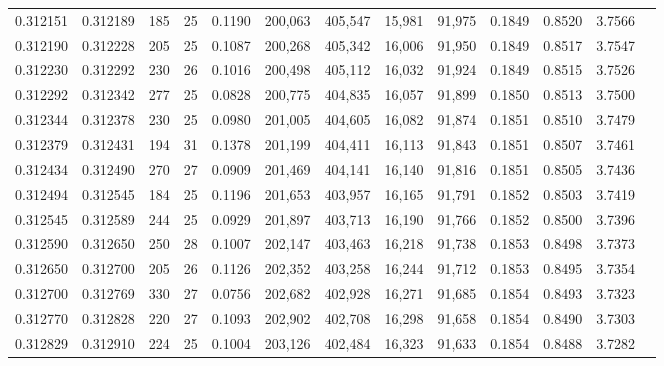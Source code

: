 \begin{tabular}{rrrrrrrrrrrrr}
0.312151 & 0.312189 &   185 &  25 &                                     0.1190 & 200,063 & 405,547 &  15,981 &  91,975 & 0.1849 & 0.8520 & 3.7566 \\
0.312190 & 0.312228 &   205 &  25 &                                     0.1087 & 200,268 & 405,342 &  16,006 &  91,950 & 0.1849 & 0.8517 & 3.7547 \\
0.312230 & 0.312292 &   230 &  26 &                                     0.1016 & 200,498 & 405,112 &  16,032 &  91,924 & 0.1849 & 0.8515 & 3.7526 \\
0.312292 & 0.312342 &   277 &  25 &                                     0.0828 & 200,775 & 404,835 &  16,057 &  91,899 & 0.1850 & 0.8513 & 3.7500 \\
0.312344 & 0.312378 &   230 &  25 &                                     0.0980 & 201,005 & 404,605 &  16,082 &  91,874 & 0.1851 & 0.8510 & 3.7479 \\
0.312379 & 0.312431 &   194 &  31 &                                     0.1378 & 201,199 & 404,411 &  16,113 &  91,843 & 0.1851 & 0.8507 & 3.7461 \\
0.312434 & 0.312490 &   270 &  27 &                                     0.0909 & 201,469 & 404,141 &  16,140 &  91,816 & 0.1851 & 0.8505 & 3.7436 \\
0.312494 & 0.312545 &   184 &  25 &                                     0.1196 & 201,653 & 403,957 &  16,165 &  91,791 & 0.1852 & 0.8503 & 3.7419 \\
0.312545 & 0.312589 &   244 &  25 &                                     0.0929 & 201,897 & 403,713 &  16,190 &  91,766 & 0.1852 & 0.8500 & 3.7396 \\
0.312590 & 0.312650 &   250 &  28 &                                     0.1007 & 202,147 & 403,463 &  16,218 &  91,738 & 0.1853 & 0.8498 & 3.7373 \\
0.312650 & 0.312700 &   205 &  26 &                                     0.1126 & 202,352 & 403,258 &  16,244 &  91,712 & 0.1853 & 0.8495 & 3.7354 \\
0.312700 & 0.312769 &   330 &  27 &                                     0.0756 & 202,682 & 402,928 &  16,271 &  91,685 & 0.1854 & 0.8493 & 3.7323 \\
0.312770 & 0.312828 &   220 &  27 &                                     0.1093 & 202,902 & 402,708 &  16,298 &  91,658 & 0.1854 & 0.8490 & 3.7303 \\
0.312829 & 0.312910 &   224 &  25 &                                     0.1004 & 203,126 & 402,484 &  16,323 &  91,633 & 0.1854 & 0.8488 & 3.7282 \\

\end{tabular}
